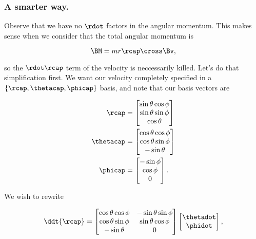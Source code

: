 \subsubsection{A smarter way.}

Observe that we have no $\rdot$ factors in the angular momentum.  This makes sense when we consider that the total angular momentum is

\begin{equation}\label{eqn:classicalMechanicsPs2:190}
\BM = m r \rcap \cross \Bv,
\end{equation}

so the $\rdot \rcap$ term of the velocity is neccessarily killed.  Let's do that simplification first.  We want our velocity completely specified in a $\{\rcap, \thetacap, \phicap\}$ basis, and note that our basis vectors are

\begin{align}\label{eqn:classicalMechanicsPs2:210}
\rcap &=
\begin{bmatrix}
\sin\theta \cos\phi \\
\sin\theta \sin\phi \\
\cos\theta
\end{bmatrix} \\
\thetacap &=
\begin{bmatrix}
\cos\theta \cos\phi \\
\cos\theta \sin\phi \\
-\sin\theta
\end{bmatrix} \\
\phicap &=
\begin{bmatrix}
-\sin\phi \\
\cos\phi \\
0
\end{bmatrix} .
\end{align}

We wish to rewrite

\begin{equation}\label{eqn:classicalMechanicsPs2:230}
\ddt{\rcap} =
\begin{bmatrix}
\cos\theta \cos\phi & - \sin\theta \sin\phi \\
\cos\theta \sin\phi & \sin\theta \cos\phi \\
-\sin\theta & 0
\end{bmatrix}
\begin{bmatrix}
\thetadot \\
\phidot
\end{bmatrix},
\end{equation}

